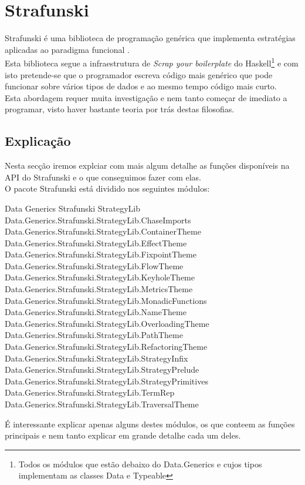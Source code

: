 \chapter{Strafunski}
\minitoc

Strafunski é uma biblioteca de programação genérica que implementa estratégias aplicadas ao paradigma funcional \cite{Lammel:2002:DPF:570186.570187,LV03-PADL}.\\
Esta biblioteca segue a infraestrutura de \textit{Scrap your boilerplate} \cite{SYB3} do
Haskell\footnote{Todos os módulos que estão debaixo do Data.Generics e cujos tipos implementam as classes Data e Typeable} e com isto pretende-se que o programador
escreva código mais genérico que pode funcionar sobre vários tipos de dados e ao mesmo tempo código mais curto.\\
Esta abordagem requer muita investigação e nem tanto começar de imediato a programar, visto haver bastante teoria por trás destas filosofias.

\section{Explicação}
Nesta secção iremos explciar com mais algum detalhe as funções disponíveis na API do Strafunski e o que conseguimos fazer com elas.\\
O pacote Strafunski está dividido nos seguintes módulos:
\begin{code_files}
Data
    Generics
        Strafunski
            StrategyLib
                Data.Generics.Strafunski.StrategyLib.ChaseImports
                Data.Generics.Strafunski.StrategyLib.ContainerTheme
                Data.Generics.Strafunski.StrategyLib.EffectTheme
                Data.Generics.Strafunski.StrategyLib.FixpointTheme
                Data.Generics.Strafunski.StrategyLib.FlowTheme
                Data.Generics.Strafunski.StrategyLib.KeyholeTheme
                Data.Generics.Strafunski.StrategyLib.MetricsTheme
                Data.Generics.Strafunski.StrategyLib.MonadicFunctions
                Data.Generics.Strafunski.StrategyLib.NameTheme
                Data.Generics.Strafunski.StrategyLib.OverloadingTheme
                Data.Generics.Strafunski.StrategyLib.PathTheme
                Data.Generics.Strafunski.StrategyLib.RefactoringTheme
                Data.Generics.Strafunski.StrategyLib.StrategyInfix
                Data.Generics.Strafunski.StrategyLib.StrategyPrelude
                Data.Generics.Strafunski.StrategyLib.StrategyPrimitives
                Data.Generics.Strafunski.StrategyLib.TermRep
                Data.Generics.Strafunski.StrategyLib.TraversalTheme
\end{code_files}
É interessante explicar apenas alguns destes módulos, os que conteem as funções principais e nem tanto explicar em grande detalhe cada um deles.\\

